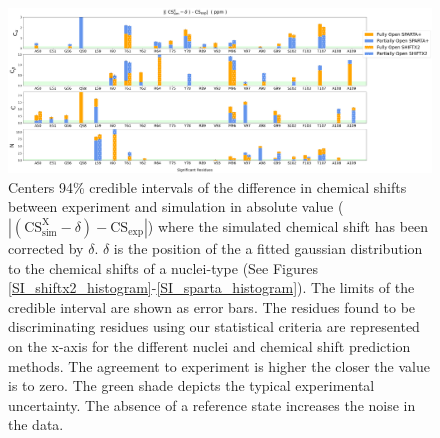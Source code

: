 \documentclass[%
 aip,
 amsmath,amssymb,
 preprint,%
]{revtex4-1}
\begin{document}
\begin{figure}[tbp]
	\includegraphics[width=\textwidth]{figures_SI/assignment_skew_model_markers_shifted_print.png}
	 \caption{\scriptsize
Centers 94\% credible intervals of the difference in chemical shifts between experiment and simulation in absolute value ($|(\text{CS}_{\text{sim}}^{\text{X}}-\delta)-\text{CS}_{\text{exp}}|$) where the simulated chemical shift has been corrected by $\delta$. $\delta$ is the position of the a fitted gaussian distribution to the chemical shifts of a nuclei-type (See Figures \ref{SI_shiftx2_histogram}-\ref{SI_sparta_histogram}). The limits of the credible interval are shown as error bars. The residues found to be discriminating residues using our statistical criteria are represented on the x-axis for the different nuclei and chemical shift prediction methods. The agreement to experiment is higher the closer the value is to zero. The green shade depicts the typical experimental uncertainty. The absence of a reference state increases the noise in the data. 
}
\label{SI_assignment_shift}
\end{figure}

\clearpage
\end{document}
